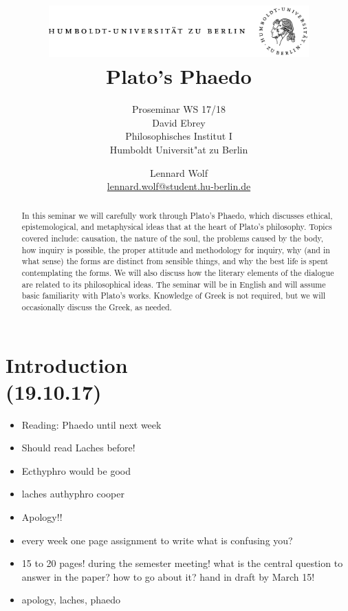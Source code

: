 \documentclass[emulatestandardclasses]{scrartcl}
\date{\vspace{-3ex}}
\begin{document}
\title{
	\includegraphics*[width=0.75\textwidth]{ErstesSem/images/hu_logo.png}\\
	\vspace{24pt}
	Plato's Phaedo}
\subtitle{\vspace{10pt}Proseminar WS 17/18\\
          David Ebrey\\
          Philosophisches Institut I \\ 
          Humboldt Universit"at zu Berlin}
\author{Lennard Wolf\\
        \small{\href{mailto:lennard.wolf@student.hu-berlin.de}{lennard.wolf@student.hu-berlin.de}}}
\maketitle
\begin{abstract}
In this seminar we will carefully work through Plato's Phaedo, which discusses ethical, epistemological, and metaphysical ideas that at the heart of Plato’s philosophy. Topics covered include: causation, the nature of the soul, the problems caused by the body, how inquiry is possible, the proper attitude and methodology for inquiry, why (and in what sense) the forms are distinct from sensible things, and why the best life is spent contemplating the forms. We will also discuss how the literary elements of the dialogue are related to its philosophical ideas.
The seminar will be in English and will assume basic familiarity with Plato's works. Knowledge of Greek is not required, but we will occasionally discuss the Greek, as needed.
\end{abstract}
\newpage

\tableofcontents
\newpage


\section{Introduction\\(19.10.17)}

\begin{itemize}
  \item Reading: Phaedo until next week
  \item Should read Laches before!
  \item Ecthyphro would be good 
  \item laches authyphro cooper
  \item Apology!!
  \item every week one page assignment to write what is confusing you?
  \item 15 to 20 pages! during the semester meeting! what is the central question to answer in the paper? how to go about it? hand in draft by March 15!
  \item apology, laches, phaedo 
\end{itemize}
\end{document}

